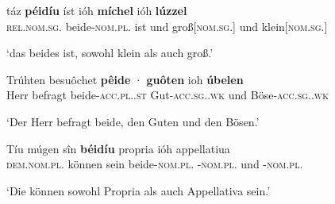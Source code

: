 
\begin{exe}
\ex \label{ex:beidejohahd}
	\begin{xlist}
	\ex \label{ex:beidejohahd_1}
		\gll táz \textbf{péidíu} íst ióh \textbf{míchel} ióh \textbf{lúzzel} \\
			\textsc{rel.nom.sg.\NeutI} beide-\textsc{nom.pl.\NeutI} ist und
			groß[\textsc{nom.sg.\NeutI}] und klein[\textsc{nom.sg.\NeutI}] \\
		\begin{taggedline}{\parencites(11.~Jh.)[Notker, Boethius/Categoriae 57: 28--34]{ddd}}
		\trans `das beides ist, sowohl klein als auch groß.'
		\end{taggedline}

	\ex \label{ex:beidejohahd_2}
		\gll Trúhten besuôchet \textbf{pêide} · \textbf{guôten} ioh
				\textbf{úbelen} \\
			Herr befragt beide-\textsc{acc.pl.\MascA.st} {}
				Gut-\textsc{acc.sg.\MascA.wk} und
				Böse-\textsc{acc.sg.\MascA.wk} \\
		\begin{taggedline}{\parencites(11.~Jh.)[Notker, Psalmen 10, 34--36: 395--401]{ddd}} %
		\trans `Der Herr befragt beide, den Guten und den Bösen.'
		\end{taggedline}

	\ex \label{ex:beidejohahd_3}
		\gll Tíu múgen sîn \textbf{béidíu} propria ióh appellatiua \\
			\textsc{dem.nom.pl.\NeutI} können sein beide-\textsc{nom.pl.\NeutI}
				-\textsc{nom.pl.\NeutI} und
				-\textsc{nom.pl.\NeutI} \\
		\begin{taggedline}{\parencites(11.~Jh.)[Notker, Boethius/Categoriae 6: 119--125]{ddd}}
		\trans `Die können sowohl Propria als auch Appellativa sein.'
		\end{taggedline}
	\end{xlist}
\end{exe}

